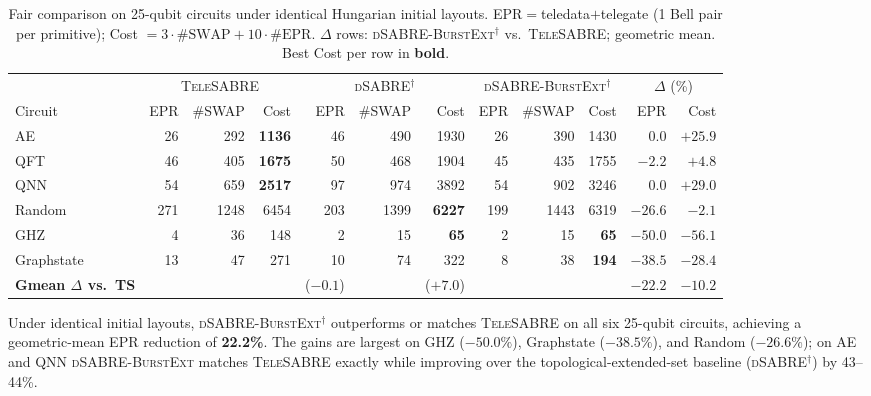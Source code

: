 \documentclass[conference]{IEEEtran}
\newcommand{\dSABRE}{\textsc{dSABRE}}
\newcommand{\BurstExt}{\textsc{dSABRE-BurstExt}}
\newcommand{\TeleSABRE}{\textsc{TeleSABRE}}
\begin{document}
\begin{table}[t]
\centering
\caption{Fair comparison on 25-qubit circuits under identical Hungarian initial
  layouts.  EPR$=$teledata$+$telegate (1 Bell pair per primitive);
  Cost $= 3\!\cdot\!\#\mathrm{SWAP}+10\!\cdot\!\#\mathrm{EPR}$.
  $\Delta$ rows: \BurstExt$^{\dagger}$ vs.\ \TeleSABRE{}; geometric mean.
  Best Cost per row in \textbf{bold}.}
\label{tab:telesabre}
\setlength{\tabcolsep}{5pt}
\begin{tabular}{@{}l rrr rrr rrr rr@{}}
\toprule
 & \multicolumn{3}{c}{\TeleSABRE}
 & \multicolumn{3}{c}{\dSABRE$^{\dagger}$}
 & \multicolumn{3}{c}{\BurstExt$^{\dagger}$}
 & \multicolumn{2}{c}{$\Delta$ (\%)} \\
\cmidrule(lr){2-4}\cmidrule(lr){5-7}\cmidrule(lr){8-10}\cmidrule(lr){11-12}
Circuit & EPR & \#SWAP & Cost & EPR & \#SWAP & Cost & EPR & \#SWAP & Cost & EPR & Cost \\
\midrule
AE         &  26 &  292 & \textbf{1136} &  46 &  490 & 1930 &  26 &  390 & 1430 & $\phantom{-}0.0$ & $+25.9$ \\
QFT        &  46 &  405 & \textbf{1675} &  50 &  468 & 1904 &  45 &  435 & 1755 & $-2.2$ & $+4.8$ \\
QNN        &  54 &  659 & \textbf{2517} &  97 &  974 & 3892 &  54 &  902 & 3246 & $\phantom{-}0.0$ & $+29.0$ \\
Random     & 271 & 1248 & 6454 & 203 & 1399 & \textbf{6227} & 199 & 1443 & 6319 & $-26.6$ & $-2.1$ \\
GHZ        &   4 &   36 & 148  &   2 &   15 & \textbf{65}   &   2 &   15 & \textbf{65}  & $-50.0$ & $-56.1$ \\
Graphstate &  13 &   47 & 271  &  10 &   74 & 322  &   8 &   38 & \textbf{194} & $-38.5$ & $-28.4$ \\
\midrule
\textbf{Gmean $\Delta$ vs.\ TS} & & & & ($-0.1$) & & ($+7.0$) & & & & $\mathbf{-22.2}$ & $\mathbf{-10.2}$ \\
\bottomrule
\end{tabular}
\end{table}

Under identical initial layouts, \BurstExt$^{\dagger}$ outperforms or matches
\TeleSABRE{} on all six 25-qubit circuits, achieving a geometric-mean EPR
reduction of \textbf{22.2\%}.
The gains are largest on GHZ ($-50.0\%$), Graphstate ($-38.5\%$), and
Random ($-26.6\%$);
on AE and QNN \BurstExt{} matches \TeleSABRE{} exactly while improving over
the topological-extended-set baseline (\dSABRE$^{\dagger}$) by 43--44\%.
\end{document}

